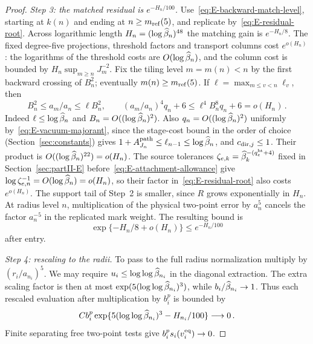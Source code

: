 \begin{proof}
\emph{Step 3: the matched residual is $e^{-H_n/100}$.} Use~\eqref{eq:E-backward-match-level}, starting at $k(n)$ and ending at $n\ge m_{\mathrm{ref}}(5)$, and replicate by~\eqref{eq:E-residual-root}. Across logarithmic length $H_n=(\log\widehat{\beta}_n)^{48}$ the matching gain is $e^{-H_n/8}$. The fixed degree-five projections, threshold factors and transport columns cost $e^{o(H_n)}$: the logarithms of the threshold costs are $O(\log\widehat{\beta}_n)$, and the column cost is bounded by $H_n\sup_{m\ge n}J_m^{-2}$. Fix the tiling level $m=m(n)<n$ by the first backward crossing of $B_n^2$; eventually $m(n)\ge m_{\mathrm{ref}}(5)$. If $\ell=\max_{m\le v<n}\ell_v$, then
\begin{equation*}
 B_n^2\le a_m/a_n\le\ell B_n^2,\qquad
 (a_m/a_n)^4q_n+6\le\ell^4B_n^8q_n+6=o(H_n)\,.
\end{equation*}
Indeed $\ell\le\log\widehat{\beta}_n$ and $B_n=O((\log\widehat{\beta}_n)^2)$. Also $q_n=O((\log\widehat{\beta}_n)^2)$ uniformly by~\eqref{eq:E-vacuum-majorant}, since the stage-cost bound in the order of choice (Section~\ref{sec:constants}) gives $1+A^{\rm path}_{J_n}\le\ell_{n-1}\le\log\widehat{\beta}_n$, and $c_{{\rm dir},j}\le1$. Their product is $O((\log\widehat{\beta}_n)^{22})=o(H_n)$. The source tolerances $\zeta_{e,k}=\widehat{\beta}_k^{-(q^{\rm ht}_e+4)}$ fixed in Section~\ref{sec:partII-E} before~\eqref{eq:E-attachment-allowance} give $\log\zeta_{e,n}^{-1}=O(\log\widehat{\beta}_n)=o(H_n)$, so their factor in~\eqref{eq:E-residual-root} also costs $e^{o(H_n)}$. The support tail of Step~2 is smaller, since $R$ grows exponentially in $H_n$. At radius level $n$, multiplication of the physical two-point error by $a_n^5$ cancels the factor $a_n^{-5}$ in the replicated mark weight. The resulting bound is
\begin{equation*}
 \exp\{-H_n/8+o(H_n)\}\le e^{-H_n/100}
\end{equation*}
after entry.

\emph{Step 4: rescaling to the radii.} To pass to the full radius normalization multiply by $(r_i/a_{n_i})^5$. We may require $u_i\le\log\log\widehat{\beta}_{n_i}$ in the diagonal extraction. The extra scaling factor is then at most $\exp(5(\log\log\widehat{\beta}_{n_i})^3)$, while $b_i/\widehat{\beta}_{n_i}\to1$. Thus each rescaled evaluation after multiplication by $b_i^p$ is bounded by
\begin{equation*}
 C b_i^p\exp\{5(\log\log\widehat{\beta}_{n_i})^3-H_{n_i}/100\}\longrightarrow0\,.
\end{equation*}
Finite separating free two-point tests give $b_i^ps_i(v_i^{\rm eq})\to0$.


\end{proof}
